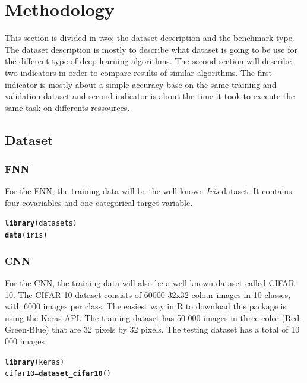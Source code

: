 \documentclass[6pt,letter]{article}\usepackage[]{graphicx}\usepackage[]{color}
\makeatletter
\newcommand{\hlstd}[1]{\textcolor[rgb]{0.345,0.345,0.345}{#1}}%
\newcommand{\hlkwb}[1]{\textcolor[rgb]{0.69,0.353,0.396}{#1}}%
\newcommand{\hlkwd}[1]{\textcolor[rgb]{0.737,0.353,0.396}{\textbf{#1}}}%
\newenvironment{kframe}{%
 \def\at@end@of@kframe{}%
 \ifinner\ifhmode%
  \def\at@end@of@kframe{\end{minipage}}%
  \begin{minipage}{\columnwidth}%
 \fi\fi%
 \def\FrameCommand##1{\hskip\@totalleftmargin \hskip-\fboxsep
 \colorbox{shadecolor}{##1}\hskip-\fboxsep
     \hskip-\linewidth \hskip-\@totalleftmargin \hskip\columnwidth}%
 \MakeFramed {\advance\hsize-\width
   \@totalleftmargin\z@ \linewidth\hsize
   \@setminipage}}%
 {\par\unskip\endMakeFramed%
 \at@end@of@kframe}
\newenvironment{knitrout}{}{} %
\makeatother
\begin{document}
\section{Methodology}
This section is divided in two;  the dataset description and the benchmark type. The dataset description is mostly to describe what dataset is going to be use for the different type of deep learning algorithms. The second section will describe two indicators in order to compare results of similar algorithms. The first indicator is mostly about a simple accuracy base on the same training and validation dataset and second indicator is about the time it took to execute the same task on differents ressources.
\subsection{Dataset}
\subsubsection{FNN}
For the \ac{FNN}, the training data will be the well known \textit{Iris} dataset. It contains four covariables and one categorical target variable.
\begin{knitrout}
\color{fgcolor}\begin{kframe}
\begin{alltt}
\hlkwd{library}\hlstd{(datasets)}
\hlkwd{data}\hlstd{(iris)}
\end{alltt}
\end{kframe}
\end{knitrout}

\subsubsection{CNN}
For the \ac{CNN}, the training data will also be a well known dataset called CIFAR-10. The CIFAR-10 dataset consists of 60000 32x32 colour images in 10 classes, with 6000 images per class. The easiest way in R to download this package is using the Keras API. The training dataset has 50 000 images in three color (Red-Green-Blue) that are 32 pixels by 32 pixels. The testing dataset has a total of 10 000 images
\begin{knitrout}
\color{fgcolor}\begin{kframe}
\begin{alltt}
\hlkwd{library}\hlstd{(keras)}
\hlstd{cifar10} \hlkwb{=} \hlkwd{dataset_cifar10}\hlstd{()}
\end{alltt}
\end{kframe}
\end{knitrout}
\end{document}
